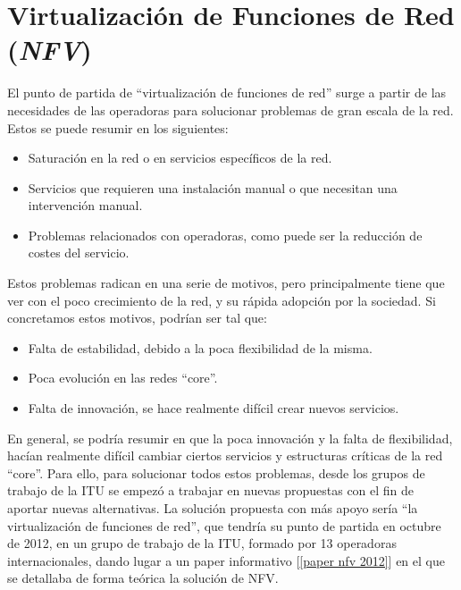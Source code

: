 \documentclass[12pt]{article}
\begin{document}
	
	\pagebreak
	
	\section{Virtualización de Funciones de Red (\textit{NFV})}
	\label{sec: nfv}
	\noindent El punto de partida de ``virtualización de funciones de red'' surge a partir de las necesidades de las operadoras para solucionar problemas de gran escala de la red. Estos se puede resumir en los siguientes:
	\begin{itemize}
		\item Saturación en la red o en servicios específicos de la red.
		\item Servicios que requieren una instalación manual o que necesitan una intervención manual.
		\item Problemas relacionados con operadoras, como puede ser la reducción de costes del servicio.
	\end{itemize}
	\noindent Estos problemas radican en una serie de motivos, pero principalmente tiene que ver con el poco crecimiento de la red, y su rápida adopción por la sociedad. Si concretamos estos motivos, podrían ser tal que:
	\begin{itemize}
		\item Falta de estabilidad, debido a la poca flexibilidad de la misma.
		\item Poca evolución en las redes ``core''.
		\item Falta de innovación, se hace realmente difícil crear nuevos servicios.
	\end{itemize}

	\noindent En general, se podría resumir en que la poca innovación y la falta de flexibilidad, hacían realmente difícil cambiar ciertos servicios y estructuras críticas de la red ``core''. Para ello, para solucionar todos estos problemas, desde los grupos de trabajo de la ITU se empezó a trabajar en nuevas propuestas con el fin de aportar nuevas alternativas. La solución propuesta con más apoyo sería ``la virtualización de funciones de red'', que tendría su punto de partida en octubre de 2012, en un grupo de trabajo de la ITU, formado por 13 operadoras internacionales, dando lugar a un paper informativo [\ref{paper nfv 2012}] en el que se detallaba de forma teórica la solución de NFV.
	
\end{document}
